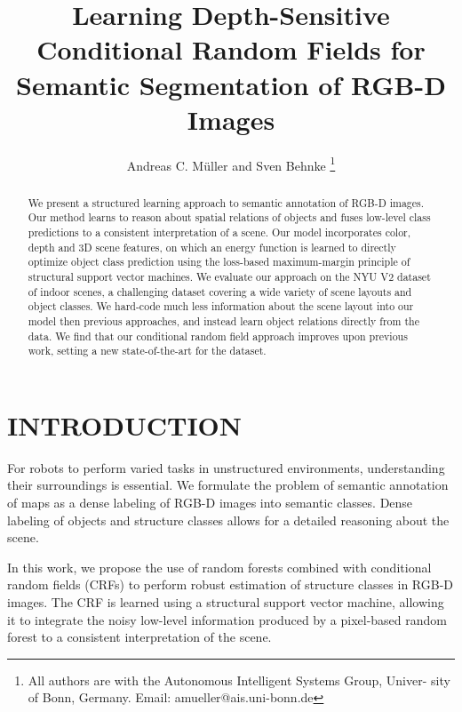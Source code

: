 \documentclass[a4paper, 10pt, conference]{ieeeconf}      %
\title{\LARGE \bf
Learning Depth-Sensitive Conditional Random Fields for Semantic Segmentation of RGB-D Images
}
\author{Andreas C. M\"uller and Sven Behnke
\thanks{All authors are with the Autonomous Intelligent Systems Group, Univer-
        sity of Bonn, Germany. Email: amueller@ais.uni-bonn.de
    }}
\begin{document}
\maketitle
\thispagestyle{empty}
\pagestyle{empty}


\begin{abstract}
    We present a structured learning approach to semantic annotation of RGB-D
    images. 
    Our method learns to reason about spatial relations of objects and
    fuses low-level class predictions to a consistent interpretation of a
    scene. Our model incorporates color, depth and 3D scene features, on which
    an energy function is learned to directly optimize object class prediction using
    the loss-based maximum-margin principle of structural support vector machines.
    We evaluate our approach on the NYU V2 dataset of indoor scenes, a challenging
    dataset covering a wide variety of scene layouts and object classes. We
    hard-code much less information about the scene layout into our model then previous
    approaches, and instead learn object relations directly from the data. We
    find that our conditional random field approach improves upon previous
    work, setting a new state-of-the-art for the dataset.
\end{abstract}


\section{INTRODUCTION}
For robots to perform varied tasks in unstructured environments, understanding their
surroundings is essential. We formulate the problem of semantic annotation of maps
as a dense labeling of RGB-D images into semantic classes. Dense labeling of objects
and structure classes allows for a detailed reasoning about the scene.

In this work, we propose the use of random forests combined with conditional
random fields (CRFs) to perform robust estimation of structure classes in RGB-D
images. The CRF is learned using a structural support vector machine,
allowing it to integrate the noisy low-level information produced by a pixel-based
random forest to a consistent interpretation of the scene.
\end{document}
